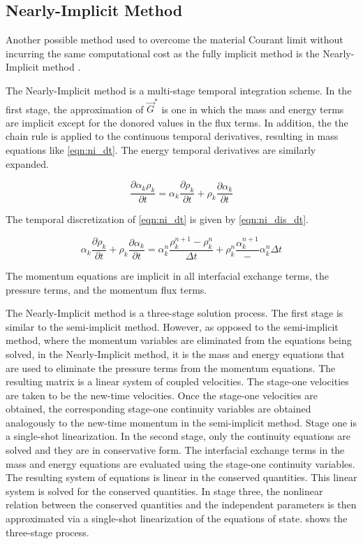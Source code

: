 \subsection{Nearly-Implicit Method}
\label{subsect:numerics_nearly_implicit}
Another possible method used to overcome the material Courant limit without incurring the same computational cost as the fully implicit method is the Nearly-Implicit method \cite{Trapp1986, RELAP}.

The Nearly-Implicit method is a multi-stage temporal integration scheme.
In the first stage, the approximation  of $\vec{G}^{*}$ is one in which the mass and energy terms are implicit except for the donored values in the flux terms. 
In addition, the the chain rule is applied to the continuous temporal derivatives, resulting in mass equations like \eqref{eqn:ni_dt}.
The energy temporal derivatives are similarly expanded.

\begin{equation}
\label{eqn:ni_dt}
\frac{\partial \alpha_k \rho_k}{\partial t} = \alpha_k \frac{\partial \rho_k}{\partial t} + \rho_k \frac{\partial \alpha_k}{\partial t}
\end{equation}

The temporal discretization of \eqref{eqn:ni_dt} is given by \eqref{eqn:ni_dis_dt}.

\begin{equation}
\label{eqn:ni_dis_dt}
\alpha_k \frac{\partial \rho_k}{\partial t} + \rho_k \frac{\partial \alpha_k}{\partial t} = \alpha^n_k\frac{ \rho^{n+1}_k - \rho^{n}_k}{\Delta t} + \rho^{n}_k\frac{\alpha^{n+1}_k} - \alpha^{n}_k{\Delta t}
\end{equation}

The momentum equations are implicit in all interfacial exchange terms, the pressure terms, and the momentum flux terms.

The Nearly-Implicit method is a three-stage solution process.
The first stage is similar to the semi-implicit method.
However, as opposed to the semi-implicit method, where the momentum variables are eliminated from the equations being solved, in the Nearly-Implicit method, it is the mass and energy equations that are used to eliminate the pressure terms from the momentum equations.
The resulting matrix is a linear system of coupled velocities.
The stage-one velocities are taken to be the new-time velocities.
Once the stage-one velocities are obtained, the corresponding stage-one continuity variables are obtained analogously to the new-time momentum in the semi-implicit method.
Stage one is a single-shot linearization.
In the second stage, only the continuity equations are solved and they are in conservative form.
The interfacial exchange terms in the mass and energy equations are evaluated using the stage-one continuity variables.
The resulting system of equations is linear in the conserved quantities.
This linear system is solved for the conserved quantities.
In stage three, the nonlinear relation between the conserved quantities and the independent parameters is then approximated via a single-shot linearization of the equations of state.
 shows the three-stage process.

